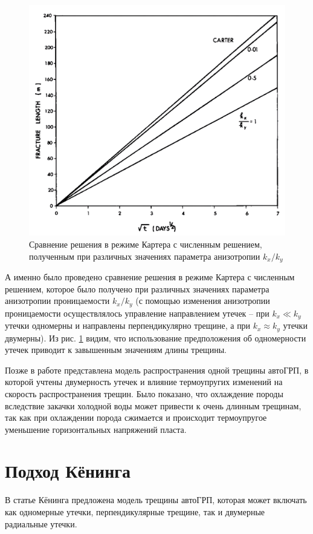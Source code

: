 \begin{figure}[H] 
\center
\includegraphics[width=.55\linewidth]{images/carter_vs_2D_leak_off.jpg}
\caption{Сравнение решения в режиме Картера с численным решением, полученным при различных значениях параметра анизотропии $k_x/k_y$ \cite{hagoort}} 
\label{fig:carter_vs_2D_leak_off}  
\end{figure}

А именно было проведено сравнение решения в режиме Картера с численным решением, которое было получено при различных значениях параметра анизотропии проницаемости $k_x/k_y$ (с помощью изменения анизотропии проницаемости осуществлялось управление направлением утечек -- при $k_x\ll k_y$ утечки одномерны и направлены перпендикулярно трещине, а при $k_x\approx k_y$ утечки двумерны).
Из рис. \ref{fig:carter_vs_2D_leak_off} видим, что использование предположения об одномерности утечек приводит к завышенным значениям длины трещины.

Позже в работе \cite{perkins_gonzalez} представлена модель распространения одной трещины автоГРП, в которой учтены двумерность утечек и влияние термоупругих изменений на скорость распространения трещин.
Было показано, что охлаждение породы вследствие закачки холодной воды может привести к очень длинным трещинам, так как при охлаждении порода сжимается и происходит термоупругое уменьшение горизонтальных напряжений пласта.

\section{Подход Кёнинга}
\vspace*{-5mm}

В статье Кёнинга \cite{koning} предложена модель трещины автоГРП, которая может включать как одномерные утечки, перпендикулярные трещине, так и двумерные радиальные утечки.

